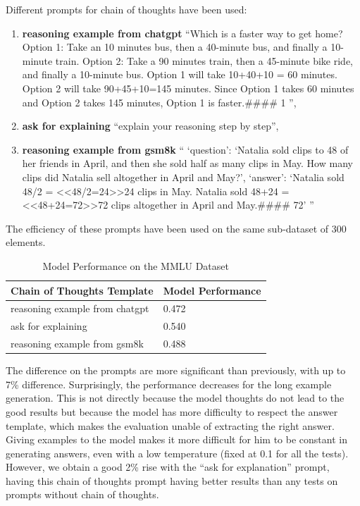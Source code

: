 \documentclass{article}
\begin{document}
    Different prompts for chain of thoughts have been used:
        \begin{enumerate}
            \item \textbf{reasoning example from chatgpt} ``Which is a faster way to get home?
            Option 1: Take an 10 minutes bus, then a 40-minute bus, and finally a 10-minute train.
            Option 2: Take a 90 minutes train, then a 45-minute bike ride, and finally a 10-minute bus.
            Option 1 will take 10+40+10 = 60 minutes.
            Option 2 will take 90+45+10=145 minutes.
            Since Option 1 takes 60 minutes and Option 2 takes 145 minutes, Option 1 is faster.\#\#\#\# 1 '',
            \item \textbf{ask for explaining} ``explain your reasoning step by step'',
            \item \textbf{reasoning example from gsm8k} `` `question': `Natalia sold clips to 48 of her friends in April, and then she sold half as many clips in May.
            How many clips did Natalia sell altogether in April and May?', `answer': `Natalia sold 48/2 =  \textless\textless48/2=24\textgreater\textgreater24 clips in May.
            Natalia sold 48+24 = \textless\textless48+24=72\textgreater\textgreater72 clips altogether in April and May.\#\#\#\# 72' ''
        \end{enumerate}

        The efficiency of these prompts have been used on the same sub-dataset of 300 elements.

        \begin{table}[htbp]
            \centering
            \caption{Model Performance on the MMLU Dataset}
            \label{tab:mmlu_performance}
            \begin{tabular}{lp{8cm}}
              \toprule
              \textbf{Chain of Thoughts Template} & \textbf{Model Performance} \\
              \midrule
              reasoning example from chatgpt & 0.472 \\
              ask for explaining & 0.540 \\
              reasoning example from gsm8k & 0.488 \\
              \bottomrule
            \end{tabular}
          \end{table}

          The difference on the prompts are more significant than previously, with up to 7\% difference.
          Surprisingly, the performance decreases for the long example generation.
          This is not directly because the model thoughts do not lead to the good results but because the model has more difficulty to respect the answer template, which makes the evaluation unable of extracting the right answer.
          Giving examples to the model makes it more difficult for him to be constant in generating answers, even with a low temperature (fixed at 0.1 for all the tests).
          However, we obtain a good 2\% rise with the ``ask for explanation'' prompt, having this chain of thoughts prompt having better results than any tests on prompts without chain of thoughts.
\end{document}
